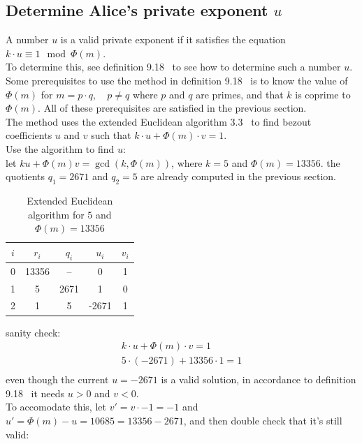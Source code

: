 \documentclass[12pt]{article}
\begin{document}
\subsection*{Determine Alice's private exponent $u$}
A number $u$ is a valid private exponent if it satisfies the equation $k \cdot u \equiv 1 \mod \Phi(m)$.\\
\newline
To determine this, see definition 9.18~\cite{Algebra} to see how to determine such a number $u$.\\
Some prerequisites to use the method in definition 9.18~\cite{Algebra} is to know the value of $\Phi(m)$ for $m = p\cdot q, \quad p \neq q $ where $p$ and $q$ are primes, and that $k$ is coprime to $\Phi(m)$. All of these prerequisites are satisfied in the previous section.\\
\newline 
The method uses the extended Euclidean algorithm 3.3~\cite{Algebra} to find bezout coefficients $u$ and $v$ such that $k \cdot u + \Phi(m) \cdot v = 1$.\\
Use the algorithm to find $u$:\\
let $ku + \Phi(m)v = \gcd(k, \Phi(m))$, where $k = 5$ and $\Phi(m) = 13356$. the quotients $q_1 = 2671$ and $q_2 = 5$ are already computed in the previous section.\\
\begin{table}[H]
\centering
\begin{tabular}{|c|c|c|c|c|}
\hline
$i$ & $r_i$ & $q_i$ & $u_i$ & $v_i$ \\ \hline
0 & 13356 & -- & 0 & 1 \\ \hline
1 & 5 & 2671 & 1 & 0 \\ \hline
2 & 1 & 5 & -2671 & 1 \\ \hline
\end{tabular}
\vspace{0.2cm}
\caption{Extended Euclidean algorithm for $5$ and $\Phi(m)=13356$}
\label{tab:extended_euclid_rsa}
\end{table}
sanity check:
\begin{align*}
    k \cdot u + \Phi(m) \cdot v = 1\\
    5 \cdot (-2671) + 13356 \cdot 1 = 1\\
\end{align*}
even though the current $u = -2671$ is a valid solution, in accordance to definition 9.18~\cite{Algebra} it needs $u > 0$ and $v < 0$.\\
To accomodate this, let $v' = v \cdot -1 = -1$ and $u' = \Phi(m) - u = 10685 = 13356 -2671$, and then double check that it's still valid:
\end{document}
